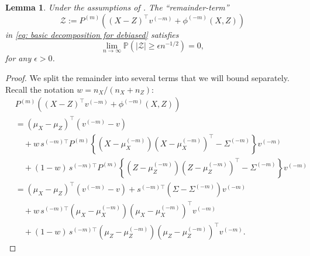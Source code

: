 \documentclass[11pt]{article}
\newtheorem{lemma}[theorem]{Lemma}
\begin{document}
\begin{lemma}
\label{lemma: remainder term}
Under the assumptions of . The ``remainder-term'' 
\begin{equation*}
\mathcal{Z}:=P^{(m)}\left((X-Z)^{\top} v^{(-m)}+\phi^{(-m)}(X, Z)\right)
\end{equation*}
in \eqref{eq: basic decomposition for debiased} satisfies
\begin{equation*}
    \lim _{n \rightarrow \infty} \mathbb{P}\left(|\mathcal{Z}| \geq \epsilon n^{-1 / 2}\right)=0,
\end{equation*}
for any $\epsilon > 0$.
\end{lemma}
\begin{proof}

 We split the remainder into several terms that we will bound separately. Recall the notation $w = n_X/(n_X + n_Z)$:
\begin{equation}\label{eq: split remainder}
\begin{aligned}
&P^{(m)}\left((X - Z)^{\top} v^{(-m)} + \phi^{(-m)}(X, Z)\right)\\
&= (\mu_X - \mu_Z)^{\top} (v^{(-m)} - v) \\
&\quad + w\, s^{(-m)\top} P^{(m)} \left\{ (X - \mu_X^{(-m)})(X - \mu_X^{(-m)})^{\top} - \Sigma^{(-m)} \right\} v^{(-m)} \\
&\quad + (1 - w)\, s^{(-m)\top} P^{(m)} \left\{ (Z - \mu_Z^{(-m)})(Z - \mu_Z^{(-m)})^{\top} - \Sigma^{(-m)} \right\} v^{(-m)} \\
&= (\mu_X - \mu_Z)^{\top} (v^{(-m)} - v) + s^{(-m)\top} (\Sigma - \Sigma^{(-m)}) v^{(-m)} \\
&\quad + w\, s^{(-m)\top} (\mu_X - \mu_X^{(-m)})(\mu_X - \mu_X^{(-m)})^{\top} v^{(-m)} \\
&\quad + (1 - w)\, s^{(-m)\top} (\mu_Z - \mu_Z^{(-m)})(\mu_Z - \mu_Z^{(-m)})^{\top} v^{(-m)}.
\end{aligned}
\end{equation}


\end{proof}
\end{document}

